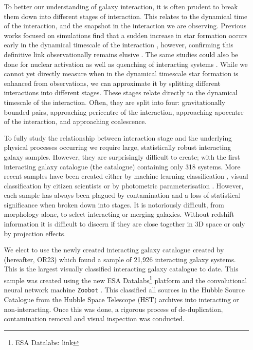 \documentclass[fleqn,usenatbib]{mnras}
\begin{document}
To better our understanding of galaxy interaction, it is often prudent to break them down into different stages of interaction. This relates to the dynamical time of the interaction, and the snapshot in the interaction we are observing. Previous works focused on simulations find that a sudden increase in star formation occurs early in the dynamical timescale of the interaction \citep{2008MNRAS.384..386C, 2019MNRAS.490.2139R}, however, confirming this definitive link observationally remains elusive \citep{2023arXiv230916531R}. The same studies could also be done for nuclear activation as well as quenching of interacting systems \citep{2011MNRAS.418.2043E, 2018PASJ...70S..37G, 2023ApJ...942..107S}. While we cannot yet directly measure when in the dynamical timescale star formation is enhanced from observations, we can approximate it by splitting different interactions into different stages. These stages relate directly to the dynamical timescale of the interaction. Often, they are split into four: gravitationally bounded pairs, approaching pericentre of the interaction, approaching apocentre of the interaction, and approaching coalescence.
 
To fully study the relationship between interaction stage and the underlying physical processes occurring we require large, statistically robust interacting galaxy samples. However, they are surprisingly difficult to create; with the first interacting galaxy catalogue (the \citet{1966ApJS...14....1A} catalogue) containing only 318 systems. More recent samples have been created either by machine learning classification \citep{2019A&A...626A..49P, 2023A&A...669A.141S}, visual classification by citizen scientists \citep{2010MNRAS.401.1043D} or by photometric parameterisation \citep{2004AJ....128..163L, 2023MNRAS.522....1N}. However, each sample has always been plagued by contamination and a loss of statistical significance when broken down into stages. It is notoriously difficult, from morphology alone, to select interacting or merging galaxies. Without redshift information it is difficult to discern if they are close together in 3D space or only by projection effects.
 
We elect to use the newly created interacting galaxy catalogue created by \citet{2023ApJ...948...40O} (hereafter, OR23) which found a sample of 21,926 interacting galaxy systems. This is the largest visually classified interacting galaxy catalogue to date. This sample was created using the new ESA Datalabs\footnote{ESA Datalabs: link} platform and the convolutional neural network machine 
\texttt{Zoobot} \citep{2022MNRAS.509.3966W, 2023JOSS....8.5312W}. This classified all sources in the Hubble Source Catalogue \citep{2016AJ....151..134W} from the Hubble Space Telescope (HST) archives into interacting or non-interacting. Once this was done, a rigorous process of de-duplication, contamination removal and visual inspection was conducted.
\end{document}
